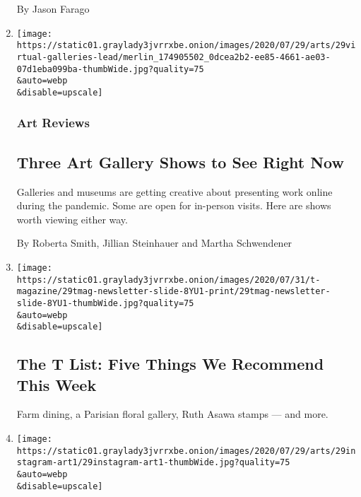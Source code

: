 \begin{enumerate}
  By Jason Farago
\item
  \href{/2020/07/30/arts/design/virtual-art-gallery-shows.html}{}

  \texttt{[image: https://static01.graylady3jvrrxbe.onion/images/2020/07/29/arts/29virtual-galleries-lead/merlin\_174905502\_0dcea2b2-ee85-4661-ae03-07d1eba099ba-thumbWide.jpg?quality=75\\\&auto=webp\\\&disable=upscale]}

  \hypertarget{art-reviews}{%
  \subsubsection{Art Reviews}\label{art-reviews}}

  \hypertarget{three-art-gallery-shows-to-see-right-now}{%
  \subsection{Three Art Gallery Shows to See Right
  Now}\label{three-art-gallery-shows-to-see-right-now}}

  Galleries and museums are getting creative about presenting work
  online during the pandemic. Some are open for in-person visits. Here
  are shows worth viewing either way.

  By Roberta Smith, Jillian Steinhauer and Martha Schwendener
\item
  \href{/2020/07/30/t-magazine/the-t-list-five-things-we-recommend-this-week.html}{}

  \texttt{[image: https://static01.graylady3jvrrxbe.onion/images/2020/07/31/t-magazine/29tmag-newsletter-slide-8YU1-print/29tmag-newsletter-slide-8YU1-thumbWide.jpg?quality=75\\\&auto=webp\\\&disable=upscale]}

  \hypertarget{the-t-list-five-things-we-recommend-this-week}{%
  \subsection{The T List: Five Things We Recommend This
  Week}\label{the-t-list-five-things-we-recommend-this-week}}

  Farm dining, a Parisian floral gallery, Ruth Asawa stamps --- and
  more.
\item
  \href{/2020/07/29/arts/design/art-accounts-to-follow-instagram.html}{}

  \texttt{[image: https://static01.graylady3jvrrxbe.onion/images/2020/07/29/arts/29instagram-art1/29instagram-art1-thumbWide.jpg?quality=75\\\&auto=webp\\\&disable=upscale]}


\end{enumerate}
